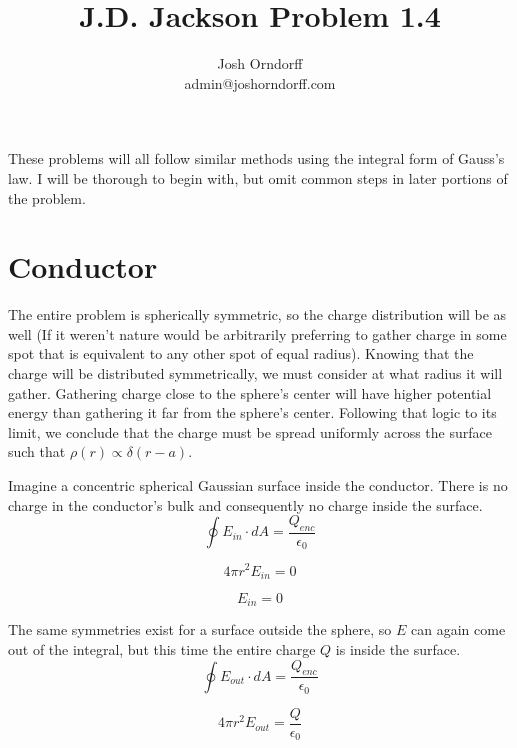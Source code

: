 \documentclass[10pt,a4paper]{article}
\begin{document}
\title{J.D. Jackson Problem 1.4}
\author{Josh Orndorff \\ admin@joshorndorff.com}
\maketitle

These problems will all follow similar methods using the integral form of Gauss's law. I will be thorough to begin with, but omit common steps in later portions of the problem.

\section{Conductor}
The entire problem is spherically symmetric, so the charge distribution will be as well (If it weren't nature would be arbitrarily preferring to gather charge in some spot that is equivalent to any other spot of equal radius). Knowing that the charge will be distributed symmetrically, we must consider at what radius it will gather. Gathering charge close to the sphere's center will have higher potential energy than gathering it far from the sphere's center. Following that logic to its limit, we conclude that the charge must be spread uniformly across the surface such that $\rho(r)\propto\delta(r-a)$.

Imagine a concentric spherical Gaussian surface inside the conductor. There is no charge in the conductor's bulk and consequently no charge inside the surface.
\begin{equation}
\oint E_{in}\cdot dA=\frac{Q_{enc}}{\epsilon_0}
\end{equation}

\begin{equation}
4\pi r^2 E_{in} = 0
\end{equation}

\begin{equation}\boxed{
E_{in}=0
}\end{equation}

The same symmetries exist for a surface outside the sphere, so $E$ can again come out of the integral, but this time the entire charge $Q$ is inside the surface.
\begin{equation}
\oint E_{out}\cdot dA=\frac{Q_{enc}}{\epsilon_0}
\end{equation}

\begin{equation}
4\pi r^2 E_{out} = \frac{Q}{\epsilon_0}
\end{equation}
\end{document}

